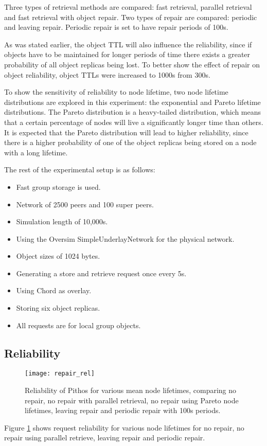 Three types of retrieval methods are compared: fast retrieval, parallel retrieval and fast retrieval with object repair. Two types of repair are compared: periodic and leaving repair. Periodic repair is set to have repair periods of 100s.

As was stated earlier, the object TTL will also influence the reliability, since if objects have to be maintained for longer periods of time there exists a greater probability of all object replicas being lost. To better show the effect of repair on object reliability, object TTLs were increased to 1000s from 300s.

To show the sensitivity of reliability to node lifetime, two node lifetime distributions are explored in this experiment: the exponential and Pareto lifetime distributions. The Pareto distribution is a heavy-tailed distribution, which means that a certain percentage of nodes will live a significantly longer time than others. It is expected that the Pareto distribution will lead to higher reliability, since there is a higher probability of one of the object replicas being stored on a node with a long lifetime.

The rest of the experimental setup is as follows:
%
\begin{itemize}
\item Fast group storage is used.
\item Network of 2500 peers and 100 super peers.
\item Simulation length of 10,000s.
\item Using the Oversim SimpleUnderlayNetwork for the physical network.
\item Object sizes of 1024 bytes.
\item Generating a store and retrieve request once every 5s.
\item Using Chord as overlay.
\item Storing six object replicas.
\item All requests are for local group objects.
\end{itemize}

\subsection{Reliability}

\begin{figure}[htbp]
 \centering
 \texttt{[image: repair\_rel]}
 \caption{Reliability of Pithos for various mean node lifetimes, comparing no repair, no repair with parallel retrieval, no repair using Pareto node lifetimes, leaving repair and periodic repair with 100s periods.}
 \label{fig_repair_rel}
\end{figure}
%
Figure \ref{fig_repair_rel} shows request reliability for various node lifetimes for no repair, no repair using parallel retrieve, leaving repair and periodic repair.

